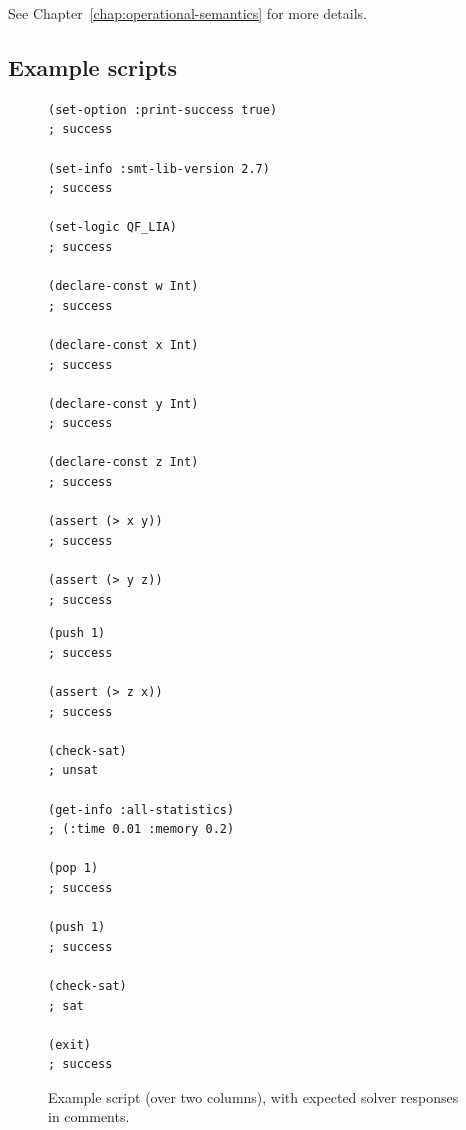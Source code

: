 \noindent See Chapter~\ref{chap:operational-semantics} for more details.


\subsection{Example scripts}

\begin{figure}
\footnotesize
\begin{minipage}[t]{.5\linewidth}
\begin{verbatim}
(set-option :print-success true)
; success

(set-info :smt-lib-version 2.7)
; success

(set-logic QF_LIA)
; success

(declare-const w Int)
; success

(declare-const x Int)
; success

(declare-const y Int)
; success

(declare-const z Int)
; success

(assert (> x y))
; success

(assert (> y z))
; success
\end{verbatim}
\end{minipage}
%
\begin{minipage}[t]{.5\linewidth}
\begin{verbatim}
(push 1)
; success

(assert (> z x))
; success

(check-sat)
; unsat

(get-info :all-statistics) 
; (:time 0.01 :memory 0.2)

(pop 1)
; success

(push 1)
; success

(check-sat)
; sat

(exit)
; success
\end{verbatim}
\end{minipage}
\medskip

\caption{\label{fig:eg1}Example script (over two columns), with expected solver responses in comments.}
\end{figure}


